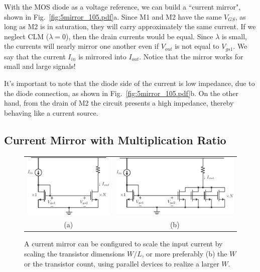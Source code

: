 With the MOS diode as a voltage reference, we can build a ``current mirror", shown in Fig.~\ref{fig:5mirror_105.pdf}a.  Since M1 and M2 have the same $V_{GS}$, as long as M2 is in saturation, they will carry approximately the same current.  If we neglect CLM ($\lambda = 0$), then the drain currents would be equal. Since $\lambda$ is small, the currents will nearly mirror one another even if $V_{out}$ is not equal to $V_{gs1}$. We say that the current $I_{in}$ is mirrored into $I_{out}$. Notice that the mirror works for small and large signals!
 
It's important to note that the diode side of the current is low impedance, due to the diode connection, as shown in Fig.~\ref{fig:5mirror_105.pdf}b.  On the other hand, from the drain of M2 the circuit presents a high impedance, thereby behaving like a current source.


\subsection{Current Mirror with Multiplication Ratio} \label{sec:interdigitate}



\begin{figure}[tb]
\begin{center}
\begin{tabular}{cc}
\includegraphics[scale=.8]{6mirror_105_amp.pdf} &
\includegraphics[scale=.8]{6mirror_105_amp_Ncopies.pdf} \\
(a) & (b) \\
\end{tabular}
\end{center}
\caption{A current mirror can be configured to scale the input current by scaling the transistor dimensions $W/L$, or more preferably (b) the $W$ or the transistor count, using parallel devices to realize a larger $W$.  } \label{fig:6mirror_105_amp.pdf}
\end{figure}

